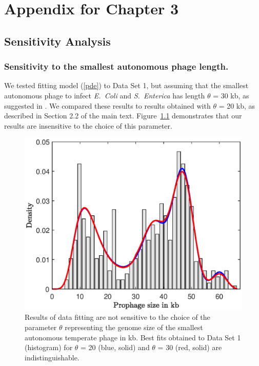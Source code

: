 \chapter{Appendix for Chapter 3}\label{AppB}
\section{Sensitivity Analysis}
\subsection{Sensitivity to the smallest autonomous phage length.}\label{bob30}
We tested fitting model (\ref{pde}) to Data Set 1, but assuming that the smallest autonomous phage to infect \textit{E.~Coli} and \textit{S.~Enterica} has length $\theta$ = 30 kb, as suggested in \cite{bobay_pervasive_2014}. We compared these results to results obtained with $\theta$ = 20 kb, as described in Section 2.2 of the main text. Figure~\ref{fig:comp_PDF} demonstrates that our results are insensitive to the choice of this parameter. 
\begin{figure}[H]
\centering
\includegraphics[scale=0.7]{comp_PDF.eps}
\caption[Results of data fitting are not sensitive to the choice of the parameter $\theta$ representing the genome size of the smallest autonomous temperate phage in kb.]{Results of data fitting are not sensitive to the choice of the parameter $\theta$ representing the genome size of the smallest autonomous temperate phage in kb.  Best fits obtained to Data Set 1 (histogram) for $\theta$ = 20 (blue, solid) and $\theta$ = 30 (red, solid) are indistinguishable.}
\label{fig:comp_PDF}
\end{figure}

